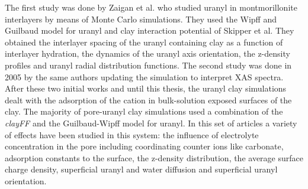 The first study was done by Zaigan et al. who studied uranyl in montmorillonite interlayers by means 
of Monte Carlo simulations. They used the Wipff and Guilbaud model for 
uranyl\cite{JMolStr_Wipff_1996,JPhysChem_Wipff_1993} and clay interaction potential of Skipper 
et al\cite{JChemPhys_Skipper_1991}. They obtained the interlayer spacing of the uranyl 
containing clay as a function of interlayer hydration, the dynamics of the uranyl axis 
orientation, the z-density profiles and uranyl radial distribution functions. The second study 
was done in 2005 by the same authors updating the simulation to interpret XAS 
spectra.\cite{ClayMinSoc_Greathouse_2005} After these two initial works and until this 
thesis, the uranyl clay simulations dealt with the adsorption of the cation in bulk-solution 
exposed surfaces of the clay. The majority of pore-uranyl clay simulations used a combination 
of the \textit{clayFF} and the Guilbaud-Wipff
model for uranyl. In this set of articles a variety of effects have been studied 
in this system: the influence of 
electrolyte concentration in the 
pore\cite{PhysChemChemPhys_Greathouse_2005,EnviSciTech_Greathouse_2006, 
InorChemFronteirs_Zhang_2015,MolSim_Cygan_2014} including coordinating counter ions like 
carbonate\cite{PhysChemChemPhys_Greathouse_2005,EnviSciTech_Greathouse_2006}, adsorption constants 
to the surface\cite{EnviSciTech_Greathouse_2006,PhysChemChemPhys_Greathouse_2005}, the z-density 
distribution\cite{InorChemFronteirs_Zhang_2015,JHazMat_Liu_2013, 
JHazMat_Yang_2013,EnviSciTech_Greathouse_2006}, the average surface charge 
density\cite{InorChemFronteirs_Zhang_2015}, superficial uranyl and water
diffusion\cite{JHazMat_Liu_2013} and superficial uranyl orientation\cite{MolSim_Cygan_2014}.





